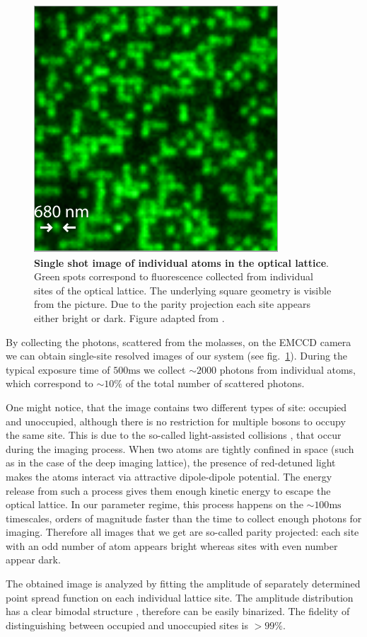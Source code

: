 \begin{figure}[t]
	\centering
	\includegraphics[scale=1]{figures/QGM_atoms.pdf}
	\caption{{\bf Single shot image of individual atoms in the optical lattice}. Green spots correspond to fluorescence collected from individual sites of the optical lattice. The underlying square geometry is visible from the picture. Due to the parity projection each site appears either bright or dark. Figure adapted from \cite{Bakr2009}.}
	\label{fig:QGM_atoms}
\end{figure}

By collecting the photons, scattered from the molasses, on the EMCCD camera we can obtain single-site resolved images of our system (see fig.~\ref{fig:QGM_atoms}). During the typical exposure time of $500 \mathrm{ms}$ we collect $\sim 2000$ photons from individual atoms, which correspond to $\sim 10\%$ of the total number of scattered photons. 

One might notice, that the image contains two different types of site: occupied and unoccupied, although there is no restriction for multiple bosons to occupy the same site. This is due to the so-called light-assisted collisions \cite{Suominen1996,Carpentier2013}, that occur during the imaging process. When two atoms are tightly confined in space (such as in the case of the deep imaging lattice), the presence of red-detuned light makes the atoms interact via attractive dipole-dipole potential. The energy release from such a process gives them enough kinetic energy to escape the optical lattice. In our parameter regime, this process happens on the $\sim100 \mathrm{ms}$ timescales, orders of magnitude faster than the time to collect enough photons for imaging. Therefore all images that we get are so-called parity projected: each site with an odd number of atom appears bright whereas sites with even number appear dark. 

The obtained image is analyzed by fitting the amplitude of separately determined point spread function on each individual lattice site. The amplitude distribution has a clear bimodal structure \cite{Bakr2009}, therefore can be easily binarized. The fidelity of distinguishing between occupied and unoccupied sites is $>99\%$.